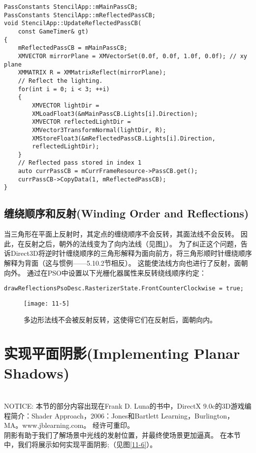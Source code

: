 \begin{lstlisting}
PassConstants StencilApp::mMainPassCB;
PassConstants StencilApp::mReflectedPassCB;
void StencilApp::UpdateReflectedPassCB(
    const GameTimer& gt)
{
    mReflectedPassCB = mMainPassCB;
    XMVECTOR mirrorPlane = XMVectorSet(0.0f, 0.0f, 1.0f, 0.0f); // xy plane
    XMMATRIX R = XMMatrixReflect(mirrorPlane);
    // Reflect the lighting.
    for(int i = 0; i < 3; ++i)
    {
        XMVECTOR lightDir =
        XMLoadFloat3(&mMainPassCB.Lights[i].Direction);
        XMVECTOR reflectedLightDir =
        XMVector3TransformNormal(lightDir, R);
        XMStoreFloat3(&mReflectedPassCB.Lights[i].Direction,
        reflectedLightDir);
    }
    // Reflected pass stored in index 1
    auto currPassCB = mCurrFrameResource->PassCB.get();
    currPassCB->CopyData(1, mReflectedPassCB);
}
\end{lstlisting}

\subsection{缠绕顺序和反射(Winding Order and Reflections)}
\begin{flushleft}
当三角形在平面上反射时，其定点的缠绕顺序不会反转，其面法线不会反转。 因此，在反射之后，朝外的法线变为了向内法线（见图\ref{fig:11-5}）。 为了纠正这个问题，告诉Direct3D将逆时针缠绕顺序的三角形解释为面向前方，将三角形顺时针缠绕顺序解释为背面（这与惯例——5.10.2节相反）。 这能使法线方向也进行了反射，面朝向外。 通过在PSO中设置以下光栅化器属性来反转绕线顺序约定：\\
\end{flushleft}

\begin{lstlisting}
drawReflectionsPsoDesc.RasterizerState.FrontCounterClockwise = true;
\end{lstlisting}

\begin{figure}[h]
    \texttt{[image: 11-5]}
    \centering
    \caption{多边形法线不会被反射反转，这使得它们在反射后，面朝向内。}
    \label{fig:11-5}
\end{figure}

\section{实现平面阴影(Implementing Planar Shadows)}
\begin{flushleft}
~\\
NOTICE: 本节的部分内容出现在Frank D. Luna的书中，DirectX 9.0c的3D游戏编程简介：Shader Approach，2006：Jones和Bartlett Learning，Burlington，MA。www.jblearning.com。 经许可重印。
~\\

阴影有助于我们了解场景中光线的发射位置，并最终使场景更加逼真。 在本节中，我们将展示如何实现平面阴影;（见图\ref{11-6}）。\\
\end{flushleft}

